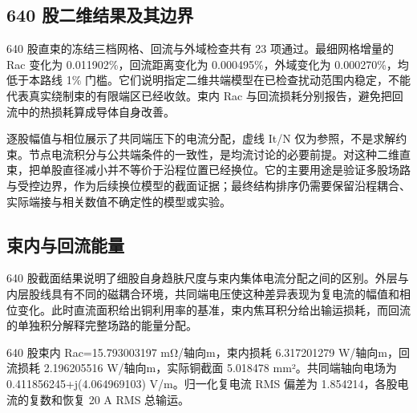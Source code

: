 \documentclass[11pt]{article}
\begin{document}
\subsection*{640 股二维结果及其边界}
\hypertarget{04.coax_results.heading}{}
640 股直束的冻结三档网格、回流与外域检查共有 23 项通过。最细网格增量的 Rac 变化为 0.011902\%，回流距离变化为 0.000495\%，外域变化为 0.000270\%，均低于本路线 1\% 门槛。它们说明指定二维共端模型在已检查扰动范围内稳定，不能代表真实绕制束的有限端区已经收敛。束内 Rac 与回流损耗分别报告，避免把回流中的热损耗算成导体自身改善。


逐股幅值与相位展示了共同端压下的电流分配，虚线 It/N 仅为参照，不是求解约束。节点电流积分与公共端条件的一致性，是均流讨论的必要前提。对这种二维直束，把单股直径减小并不等价于沿程位置已经换位。它的主要用途是验证多股场路与受控边界，作为后续换位模型的截面证据；最终结构排序仍需要保留沿程耦合、实际端接与相关数值不确定性的模型或实验。


\subsection*{束内与回流能量}
\hypertarget{04.interpretation.heading}{}
640 股截面结果说明了细股自身趋肤尺度与束内集体电流分配之间的区别。外层与内层股线具有不同的磁耦合环境，共同端电压使这种差异表现为复电流的幅值和相位变化。此时直流面积给出铜利用率的基准，束内焦耳积分给出输运损耗，而回流的单独积分解释完整场路的能量分配。


640 股束内 Rac=15.793003197 mΩ/轴向m，束内损耗 6.317201279 W/轴向m，回流损耗 2.196205516 W/轴向m，实际铜截面 5.018478 mm²。共同端轴向电场为 0.411856245+j(4.064969103) V/m。归一化复电流 RMS 偏差为 1.854214，各股电流的复数和恢复 20 A RMS 总输运。
\end{document}
